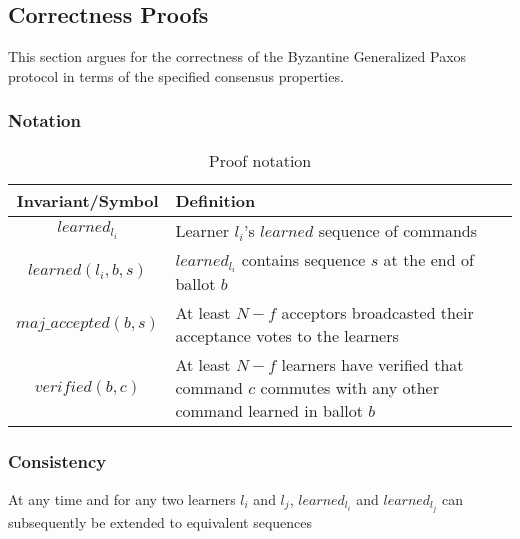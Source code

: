 \subsection{Correctness Proofs}

This section argues for the correctness of the Byzantine Generalized Paxos protocol in terms of the specified consensus properties.\par

\subsubsection{Notation}
\begin{table}[h!]
	\renewcommand{\arraystretch}{1.5}
	\centering
	\begin{tabularx}{\linewidth}{ |c|X|}
		\hline
		Invariant/Symbol & Definition \\
		\hline
		$learned_{l_i}$ & Learner $l_i$'s $learned$ sequence of commands\\
		\hline
		$learned(l_i,b,s)$ & 	$learned_{l_i}$ contains sequence $s$ at the end of ballot $b$  \\
		\hline
		$maj\_accepted(b,s)$ & At least $N-f$ acceptors broadcasted their acceptance votes to the learners\\
		\hline
		$verified(b,c)$ & At least $N-f$ learners have verified that command $c$ commutes with any other command learned in ballot $b$\\
		\hline
	\end{tabularx} 
	\caption{Proof notation} 
	\label{table:1}
\end{table}

\subsubsection{Consistency}
\begin{theorem}
At any time and for any two learners $l_i$ and $l_j$, $learned_{l_i}$ and $learned_{l_j}$ can subsequently be extended to equivalent sequences \label{C-T1}
\end{theorem} 

